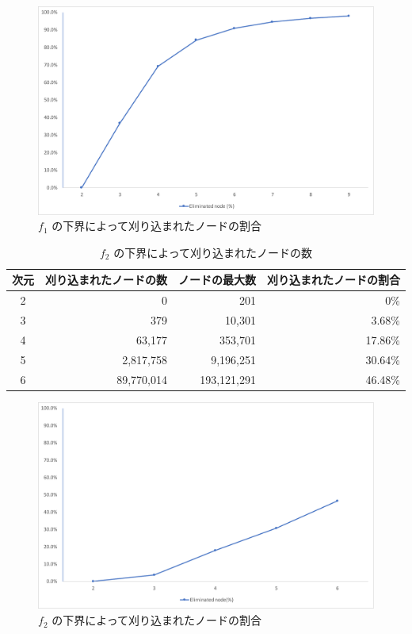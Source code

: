 \documentclass[a4paper,11pt]{jreport}
\begin{document}
\begin{figure}[h]
\begin{center}
\includegraphics[width=14cm]{graphs/f_1_eliminated.pdf}
\caption{$ f_1 $ の下界によって刈り込まれたノードの割合}
\label{fig:f_1_eliminated}
\end{center}
\end{figure}

\newpage

\begin{table}[h]
\caption{$ f_2 $ の下界によって刈り込まれたノードの数}
\label{tbl:f_2_eliminated}
\begin{center}
\begin{tabular}{|c|r|r|r|} \hline
次元 & 刈り込まれたノードの数 & ノードの最大数 & 刈り込まれたノードの割合 \\ \hline
2 & 0 & 201 & 0\% \\
3 & 379 & 10,301 & 3.68\% \\
4 & 63,177 & 353,701 & 17.86\% \\
5 & 2,817,758 & 9,196,251 & 30.64\% \\
6 & 89,770,014 & 193,121,291 & 46.48\% \\ \hline
\end{tabular}
\end{center}
\end{table}

\begin{figure}[h]
\begin{center}
\includegraphics[width=14cm]{graphs/f_2_eliminated.pdf}
\caption{$ f_2 $ の下界によって刈り込まれたノードの割合}
\label{fig:f_2_eliminated}
\end{center}
\end{figure}
\end{document}
